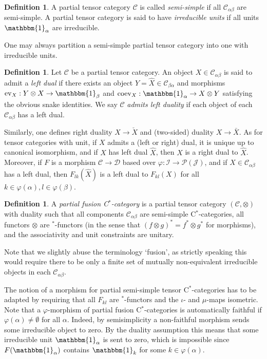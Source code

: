 \documentclass[10pt]{article}
\newcommand{\CatC}{\mathcal{C}}
\newcommand{\CatCC}{\mathscr{C}}
\newcommand{\CatDD}{\mathscr{D}}
\newcommand{\ev}{\mathrm{ev}}
\newcommand{\coev}{\mathrm{coev}}
\newcommand{\Unitb}{\mathbbm{1}}
\theoremstyle{definition}
\newtheorem{Def}[Theorem]{Definition}
\numberwithin{equation}{section}
\begin{document}
\begin{Def} A partial tensor category $\CatCC$ is called \emph{semi-simple} if all $\CatC_{\alpha\beta}$ are semi-simple. A partial tensor category is said to have \emph{irreducible units} if all units $\Unitb_\alpha$ are irreducible. 
\end{Def}

One may always partition a semi-simple partial  tensor category into one with irreducible units.

\begin{Def} Let $\CatCC$ be a partial tensor category. An object $X\in \CatC_{\alpha\beta}$ is said to admit a \emph{left dual} if there exists an object $Y=\hat{X} \in \CatC_{\beta\alpha}$ and morphisms $\ev_{X}: Y\otimes X \rightarrow \Unitb_\beta$ and $\coev_X: \Unitb_\alpha\rightarrow X\otimes Y$ satisfying the obvious snake identities. We say $\CatCC$ \emph{admits left duality} if each object of each $\CatC_{\alpha\beta}$ has a left dual.
\end{Def}

Similarly, one defines right duality $X\rightarrow \check{X}$ and (two-sided) duality $X\rightarrow \bar{X}$. As for tensor categories with unit, if $X$ admits a (left or right) dual, it is unique up to canonical isomorphism, and if $X$ has left dual $\hat{X}$, then $X$ is a right dual to $\hat{X}$. Moreover, if $F$ is a morphism $\CatCC\rightarrow \CatDD$ based over $\varphi:\mathscr{I}\rightarrow \mathscr{P}(\mathscr{J})$, and if $X\in \CatC_{\alpha\beta}$ has a left dual, then $F_{lk}(\hat{X})$ is a left dual to $F_{kl}(X)$ for all $k\in \varphi(\alpha),l \in\varphi(\beta)$.

\begin{Def}\label{DefParFus} A \emph{partial fusion C$^*$-category} is
  a partial tensor category $(\CatC,\otimes)$ with duality such that
  all components $\CatC_{\alpha\beta}$ are semi-simple C$^*$-categories,  all functors $\otimes$ are $^*$-functors (in the sense that $(f\otimes g)^* = f^*\otimes g^*$ for morphisms), and the associativity and unit constraints are unitary.
\end{Def} 

Note that we slightly abuse the terminology `fusion', as strictly speaking this would require there to be only a finite set of mutually non-equivalent irreducible objects in each $\CatC_{\alpha\beta}$. 

The notion of a morphism for partial semi-simple tensor C$^*$-categories has to be adapted by requiring that all $F_{kl}$ are $^*$-functors and the $\iota$- and $\mu$-maps isometric.  Note that a $\varphi$-morphism of partial fusion C$^*$-categories is automatically faithful if $\varphi(\alpha)\neq \emptyset$ for all $\alpha$. Indeed, by semisimplicity a non-faithful morphism sends some irreducible object to zero. By the duality assumption this means that some irreducible unit $\mathbbm{1}_{\alpha}$ is sent to zero, which is impossible since $F(\mathbbm{1}_{\alpha})$ contains $\mathbbm{1}_k$ for some $k \in \varphi(\alpha)$.
\end{document}

